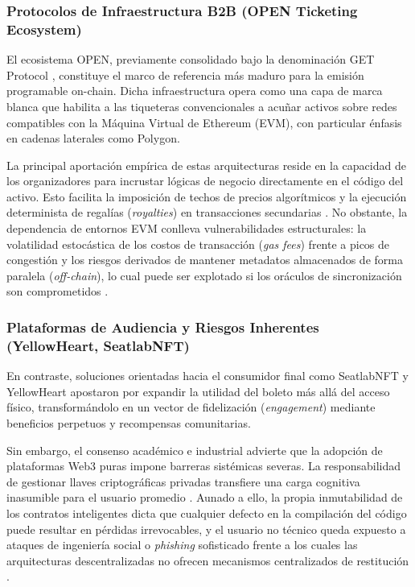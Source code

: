 \subsubsection{Protocolos de Infraestructura B2B (OPEN Ticketing Ecosystem)}

El ecosistema OPEN, previamente consolidado bajo la denominación GET Protocol \cite{getprotocol2024},
constituye el marco de referencia más maduro para la emisión programable on-chain. Dicha infraestructura
opera como una capa de marca blanca que habilita a las tiqueteras convencionales a acuñar activos sobre redes
compatibles con la Máquina Virtual de Ethereum (EVM), con particular énfasis en cadenas laterales como
Polygon.

La principal aportación empírica de estas arquitecturas reside en la capacidad de los organizadores para
incrustar lógicas de negocio directamente en el código del activo. Esto facilita la imposición de techos de
precios algorítmicos y la ejecución determinista de regalías (\textit{royalties}) en transacciones
secundarias \cite{scand2023ticketing}. No obstante, la dependencia de entornos EVM conlleva vulnerabilidades
estructurales: la volatilidad estocástica de los costos de transacción (\textit{gas fees}) frente a picos de
congestión y los riesgos derivados de mantener metadatos almacenados de forma paralela (\textit{off-chain}),
lo cual puede ser explotado si los oráculos de sincronización son comprometidos \cite{ieee2023nft}.

\subsubsection{Plataformas de Audiencia y Riesgos Inherentes (YellowHeart, SeatlabNFT)}

En contraste, soluciones orientadas hacia el consumidor final como SeatlabNFT \cite{seatlab2024} y
YellowHeart \cite{yellowheart2024} apostaron por expandir la utilidad del boleto más allá del acceso físico,
transformándolo en un vector de fidelización (\textit{engagement}) mediante beneficios perpetuos y
recompensas comunitarias. 

Sin embargo, el consenso académico e industrial advierte que la adopción de plataformas Web3 puras impone
barreras sistémicas severas. La responsabilidad de gestionar llaves criptográficas privadas transfiere una
carga cognitiva inasumible para el usuario promedio \cite{wolfandco2023}. Aunado a ello, la propia
inmutabilidad de los contratos inteligentes dicta que cualquier defecto en la compilación del código puede
resultar en pérdidas irrevocables, y el usuario no técnico queda expuesto a ataques de ingeniería social o
\textit{phishing} sofisticado frente a los cuales las arquitecturas descentralizadas no ofrecen mecanismos
centralizados de restitución \cite{wolfandco2023}.

